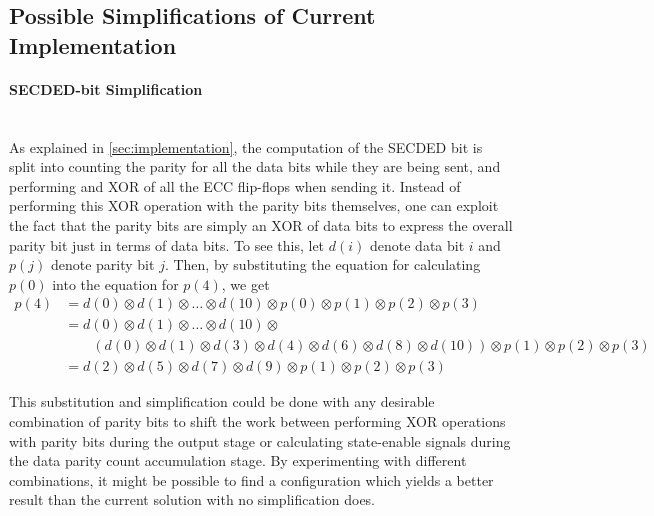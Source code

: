 \subsection{Possible Simplifications of Current Implementation}

\paragraph{SECDED-bit Simplification} \hfill \\
As explained in \autoref{sec:implementation}, the computation of the
SECDED bit is split into counting the parity for all the data bits
while they are being sent, and performing and XOR of all the ECC
flip-flops when sending it. Instead of performing this XOR operation
with the parity bits themselves, one can exploit the fact that the
parity bits are simply an XOR of data bits to express the overall
parity bit just in terms of data bits. To see this, let $d(i)$ denote
data bit $i$ and $p(j)$ denote parity bit $j$.  Then, by substituting
the equation for calculating $p(0)$ into the equation for $p(4)$, we
get
\begin{align*}
  p(4) &= d(0) \otimes d(1) \otimes \ldots \otimes d(10) \otimes p(0) \otimes p(1) \otimes p(2) \otimes p(3) \\
  &= d(0) \otimes d(1) \otimes \ldots \otimes d(10) \otimes \\
  & \qquad (d(0) \otimes d(1) \otimes d(3) \otimes d(4) \otimes d(6)
  \otimes d(8) \otimes d(10)) \otimes p(1) \otimes p(2) \otimes p(3) \\
  &= d(2) \otimes d(5) \otimes d(7) \otimes d(9) \otimes p(1) \otimes p(2) \otimes p(3)
\end{align*}

This substitution and simplification could be done with any desirable
combination of parity bits to shift the work between performing XOR
operations with parity bits during the output stage or calculating
state-enable signals during the data parity count accumulation
stage. By experimenting with different combinations, it might be
possible to find a configuration which yields a better
result than the current solution with no simplification does. 

